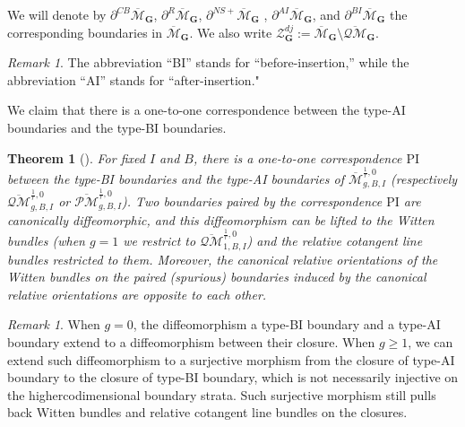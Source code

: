 \documentclass[11pt]{amsart}
\newtheorem{thm}[dummy]{Theorem}
\theoremstyle{definition}
\theoremstyle{remark}
\newtheorem{rmk}[dummy]{Remark}
\newcommand{\oPMb}{{\overline{\mathcal{PM}}}}
\newcommand{\oQMb}{{\overline{\mathcal{QM}}}}
\newcommand{\<}{\left<}
\renewcommand{\>}{\right>}
\numberwithin{equation}{section}
\def\Mbar{{\overline{\mathcal M}}}
\def\PI{{\text{PI}}}
\def\PI{\text{PI}}
\begin{document}
We will denote by $\partial^{CB} \Mbar_{\bm{G}}$, $\partial^{R} \Mbar_{\bm{G}}$, $\partial^{NS+} \Mbar_{\bm{G}}$%
, $\partial^{AI} \Mbar_{\bm{G}}$, and %
$\partial^{BI} \Mbar_{\bm{G}}$ the corresponding boundaries in $\Mbar_{\bm{G}}$. We also write $\mathcal Z^{dj}_{\bm{G}}:=\Mbar_{\bm{G}}\setminus \oQMb_{\bm{G}}$.
\begin{rmk}
    The abbreviation ``BI'' stands %
for ``before-insertion,'' while %
the abbreviation ``AI'' stands %
for ``after-insertion." 
\end{rmk}

We %
claim that there %
is a one-to-one %
correspondence between the type-AI boundaries and the type-BI boundaries.



    \begin{thm}[{\cite[Theorem 4.12]{TZ1}}]\label{thm  PI boundaries paried}
 For fixed $I$ and $B$, there is a one-to-one correspondence $\PI$ between the type-BI boundaries and the type-AI boundaries of $\Mbar^{\frac{1}{r},0}_{g,B,I}$ (respectively $\oQMb^{\frac{1}{r},0}_{g,B,I}$ or $\oPMb^{\frac{1}{r},0}_{g,B,I}$). Two boundaries paired by the correspondence $\PI$ are canonically diffeomorphic, and this diffeomorphism can be lifted to the Witten bundles (when $g=1$ we restrict to $\oQMb^{\frac{1}{r},0}_{1,B,I}$) and the relative cotangent line bundles restricted to them. Moreover, the canonical relative orientations of the Witten bundles on the paired (spurious) boundaries induced by the canonical relative orientations are opposite to each other. 
 \end{thm}

 \begin{rmk}\label{rmk non injective in PI g>0}
     When $g=0$, the diffeomorphism a type-BI boundary and a type-AI boundary extend to a diffeomorphism between their closure. When $g\ge 1$, we can extend such diffeomorphism to a surjective morphism from the closure of type-AI boundary to the closure of type-BI boundary, which is %
not necessarily injective %
on %
the highercodimensional boundary %
strata. Such surjective morphism still pulls back Witten bundles and relative cotangent line bundles on the closures.
 \end{rmk}
\end{document}
